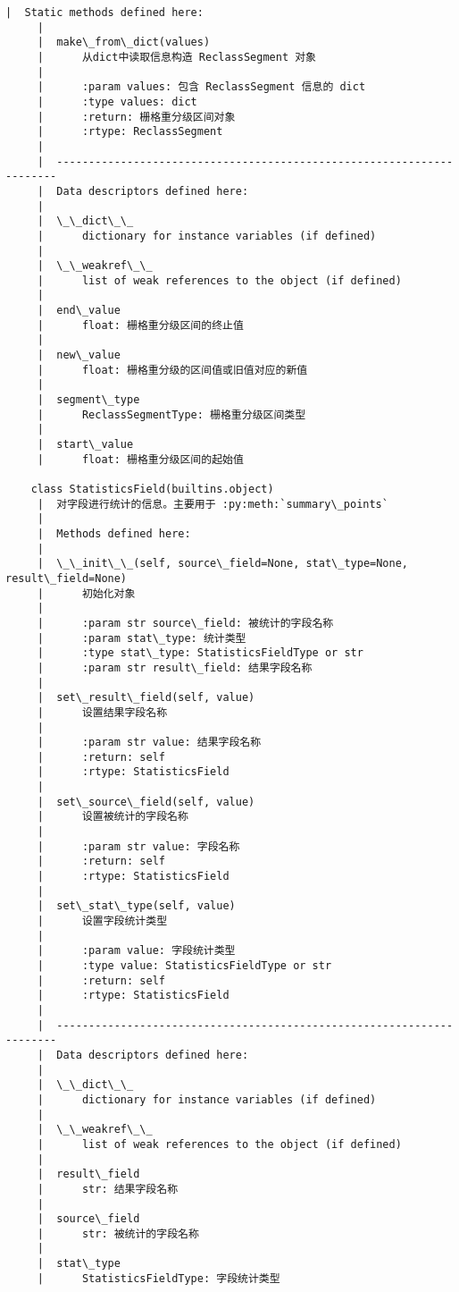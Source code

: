 \documentclass[11pt]{article}
\begin{document}
\begin{Verbatim}[commandchars=\\\{\}]
     |  Static methods defined here:
     |  
     |  make\_from\_dict(values)
     |      从dict中读取信息构造 ReclassSegment 对象
     |      
     |      :param values: 包含 ReclassSegment 信息的 dict
     |      :type values: dict
     |      :return: 栅格重分级区间对象
     |      :rtype: ReclassSegment
     |  
     |  ----------------------------------------------------------------------
     |  Data descriptors defined here:
     |  
     |  \_\_dict\_\_
     |      dictionary for instance variables (if defined)
     |  
     |  \_\_weakref\_\_
     |      list of weak references to the object (if defined)
     |  
     |  end\_value
     |      float: 栅格重分级区间的终止值
     |  
     |  new\_value
     |      float: 栅格重分级的区间值或旧值对应的新值
     |  
     |  segment\_type
     |      ReclassSegmentType: 栅格重分级区间类型
     |  
     |  start\_value
     |      float: 栅格重分级区间的起始值
    
    class StatisticsField(builtins.object)
     |  对字段进行统计的信息。主要用于 :py:meth:`summary\_points`
     |  
     |  Methods defined here:
     |  
     |  \_\_init\_\_(self, source\_field=None, stat\_type=None, result\_field=None)
     |      初始化对象
     |      
     |      :param str source\_field: 被统计的字段名称
     |      :param stat\_type: 统计类型
     |      :type stat\_type: StatisticsFieldType or str
     |      :param str result\_field: 结果字段名称
     |  
     |  set\_result\_field(self, value)
     |      设置结果字段名称
     |      
     |      :param str value: 结果字段名称
     |      :return: self
     |      :rtype: StatisticsField
     |  
     |  set\_source\_field(self, value)
     |      设置被统计的字段名称
     |      
     |      :param str value: 字段名称
     |      :return: self
     |      :rtype: StatisticsField
     |  
     |  set\_stat\_type(self, value)
     |      设置字段统计类型
     |      
     |      :param value: 字段统计类型
     |      :type value: StatisticsFieldType or str
     |      :return: self
     |      :rtype: StatisticsField
     |  
     |  ----------------------------------------------------------------------
     |  Data descriptors defined here:
     |  
     |  \_\_dict\_\_
     |      dictionary for instance variables (if defined)
     |  
     |  \_\_weakref\_\_
     |      list of weak references to the object (if defined)
     |  
     |  result\_field
     |      str: 结果字段名称
     |  
     |  source\_field
     |      str: 被统计的字段名称
     |  
     |  stat\_type
     |      StatisticsFieldType: 字段统计类型


\end{Verbatim}
\end{document}
